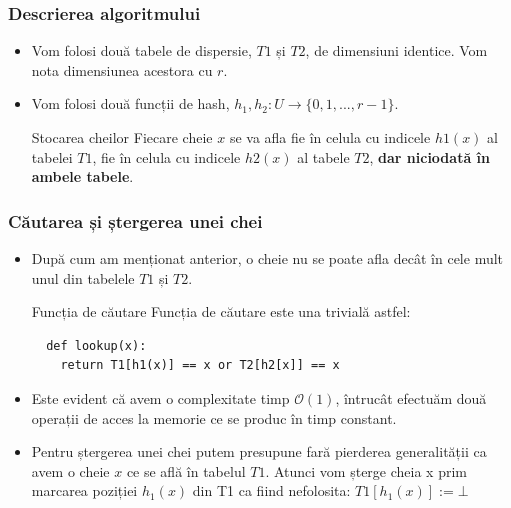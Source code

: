 \documentclass{beamer}
\begin{document}
\begin{frame}
\frametitle{Descrierea algoritmului}
\begin{itemize}
\item Vom folosi două tabele de dispersie, $T1$ și $T2$, de dimensiuni identice. Vom nota dimensiunea acestora cu $r$.
\item Vom folosi două funcții de hash, $h_1, h_2: U \to \{0, 1, ..., r-1\}$.
\begin{block}{Stocarea cheilor}
Fiecare cheie $x$ se va afla fie în celula cu indicele $h1(x)$ al tabelei $T1$, fie în celula cu indicele $h2(x)$ al tabele $T2$, \textbf{dar niciodată în ambele tabele}.
\end{block}
\end{itemize}

\end{frame}
\begin{frame}[fragile]
\frametitle{Căutarea și ștergerea unei chei}
\begin{itemize}
\item După cum am menționat anterior, o cheie nu se poate afla decât în cele mult unul din tabelele $T1$ și $T2$.
\begin{block}{Funcția de căutare}
Funcția de căutare este una trivială astfel:
\begin{lstlisting}
  def lookup(x):
   	return T1[h1(x)] == x or T2[h2[x]] == x
\end{lstlisting}
\end{block}
\item Este evident că avem o complexitate timp $\mathcal{O}(1)$, întrucât efectuăm două operații de acces la memorie ce se produc în timp constant.
\item Pentru ștergerea unei chei putem presupune fară pierderea generalității ca avem o cheie $x$ ce se află în tabelul $T1$. Atunci vom șterge cheia x prim marcarea poziției $h_1(x)$ din T1 ca fiind nefolosita: $T1[h_1(x)] := \bot$
\end{itemize}

\end{frame}
\end{document}
